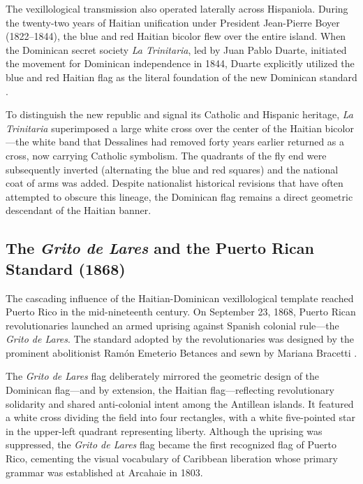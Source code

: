 The vexillological transmission also operated laterally across Hispaniola. During the twenty-two years of Haitian unification under President Jean-Pierre Boyer (1822--1844), the blue and red Haitian bicolor flew over the entire island. When the Dominican secret society \textit{La Trinitaria}, led by Juan Pablo Duarte, initiated the movement for Dominican independence in 1844, Duarte explicitly utilized the blue and red Haitian flag as the literal foundation of the new Dominican standard \cite{haiti_constitution_1805}.

To distinguish the new republic and signal its Catholic and Hispanic heritage, \textit{La Trinitaria} superimposed a large white cross over the center of the Haitian bicolor---the white band that Dessalines had removed forty years earlier returned as a cross, now carrying Catholic symbolism. The quadrants of the fly end were subsequently inverted (alternating the blue and red squares) and the national coat of arms was added. Despite nationalist historical revisions that have often attempted to obscure this lineage, the Dominican flag remains a direct geometric descendant of the Haitian banner.

\subsection{The \textit{Grito de Lares} and the Puerto Rican Standard (1868)}

The cascading influence of the Haitian-Dominican vexillological template reached Puerto Rico in the mid-nineteenth century. On September 23, 1868, Puerto Rican revolutionaries launched an armed uprising against Spanish colonial rule---the \textit{Grito de Lares}. The standard adopted by the revolutionaries was designed by the prominent abolitionist Ramón Emeterio Betances and sewn by Mariana Bracetti \cite{haiti_constitution_1805}.

The \textit{Grito de Lares} flag deliberately mirrored the geometric design of the Dominican flag---and by extension, the Haitian flag---reflecting revolutionary solidarity and shared anti-colonial intent among the Antillean islands. It featured a white cross dividing the field into four rectangles, with a white five-pointed star in the upper-left quadrant representing liberty. Although the uprising was suppressed, the \textit{Grito de Lares} flag became the first recognized flag of Puerto Rico, cementing the visual vocabulary of Caribbean liberation whose primary grammar was established at Arcahaie in 1803.

